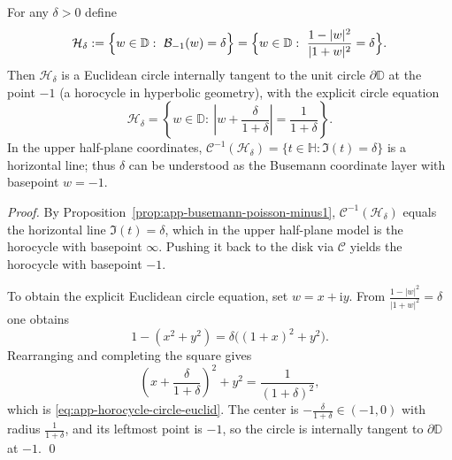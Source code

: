 \begin{theorem}[Horocycle foliation: level sets of \texorpdfstring{$\mathcal{B}_{-1}(w)=\delta$}{Bminus1=delta} are internally tangent circles]\label{thm:app-horocycle-foliation-minus1}
For any \(\delta>0\) define
\[
\mathcal{H}_{\delta}:=\Bigl\{w\in\mathbb{D}:\ \mathcal{B}_{-1}(w)=\delta\Bigr\}
=\Bigl\{w\in\mathbb{D}:\ \frac{1-|w|^{2}}{|1+w|^{2}}=\delta\Bigr\}.
\]
Then \(\mathcal{H}_{\delta}\) is a Euclidean circle internally tangent to the unit circle \(\partial\mathbb{D}\) at the point \(-1\) (a horocycle in hyperbolic geometry), with the explicit circle equation
\begin{equation}\label{eq:app-horocycle-circle-euclid}
\boxed{\;
\mathcal{H}_{\delta}
=\left\{w\in\mathbb{D}:\ \left|w+\frac{\delta}{1+\delta}\right|=\frac{1}{1+\delta}\right\}.
\;}
\end{equation}
In the upper half-plane coordinates, \(\mathcal{C}^{-1}(\mathcal{H}_{\delta})=\{t\in\mathbb{H}:\Im(t)=\delta\}\) is a horizontal line; thus \(\delta\) can be understood as the Busemann coordinate layer with basepoint \(w=-1\).
\end{theorem}

\begin{proof}
By Proposition~\ref{prop:app-busemann-poisson-minus1}, \(\mathcal{C}^{-1}(\mathcal{H}_{\delta})\) equals the horizontal line \(\Im(t)=\delta\), which in the upper half-plane model is the horocycle with basepoint \(\infty\).
Pushing it back to the disk via \(\mathcal{C}\) yields the horocycle with basepoint \(-1\).
\par
To obtain the explicit Euclidean circle equation, set \(w=x+\mathrm{i}y\).
From \(\frac{1-|w|^{2}}{|1+w|^{2}}=\delta\) one obtains
\[
1-(x^{2}+y^{2})=\delta\bigl((1+x)^{2}+y^{2}\bigr).
\]
Rearranging and completing the square gives
\[
\left(x+\frac{\delta}{1+\delta}\right)^{2}+y^{2}=\frac{1}{(1+\delta)^{2}},
\]
which is \eqref{eq:app-horocycle-circle-euclid}.
The center is \(-\frac{\delta}{1+\delta}\in(-1,0)\) with radius \(\frac{1}{1+\delta}\), and its leftmost point is \(-1\), so the circle is internally tangent to \(\partial\mathbb{D}\) at \(-1\). \qed
\end{proof}

